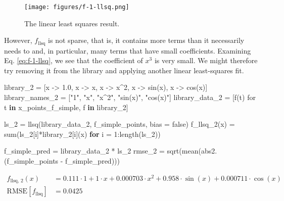 \documentclass[
]{article}
\newenvironment{Shaded}{\begin{snugshade}}{\end{snugshade}}
\newcommand{\ConstantTok}[1]{\textcolor[rgb]{0.56,0.35,0.01}{#1}}
\newcommand{\ControlFlowTok}[1]{\textcolor[rgb]{0.00,0.23,0.31}{\textbf{#1}}}
\newcommand{\FloatTok}[1]{\textcolor[rgb]{0.68,0.00,0.00}{#1}}
\newcommand{\FunctionTok}[1]{\textcolor[rgb]{0.28,0.35,0.67}{#1}}
\newcommand{\KeywordTok}[1]{\textcolor[rgb]{0.00,0.23,0.31}{\textbf{#1}}}
\newcommand{\NormalTok}[1]{\textcolor[rgb]{0.00,0.23,0.31}{#1}}
\newcommand{\OperatorTok}[1]{\textcolor[rgb]{0.37,0.37,0.37}{#1}}
\newcommand{\StringTok}[1]{\textcolor[rgb]{0.13,0.47,0.30}{#1}}
\begin{document}
\begin{figure}
    \centering
    \texttt{[image: figures/f-1-llsq.png]}
    \caption{The linear least squares result.}
    \label{fig:f-1-llsq}
\end{figure}

However, \(f_{\text{llsq}}\) is not sparse, that is, it contains more
terms than it necessarily needs to and, in particular, many terms that
have small coefficients. Examining Eq. \eqref{eq:f-1-llsq}, we see that
the coefficient of \(x^3\) is very small. We might therefore try
removing it from the library and applying another linear least-squares
fit.

\begin{Shaded}
\begin{Highlighting}[]
\NormalTok{library\_2 }\OperatorTok{=}\NormalTok{ [x }\OperatorTok{{-}\textgreater{}} \FloatTok{1.0}\NormalTok{, x }\OperatorTok{{-}\textgreater{}}\NormalTok{ x, x }\OperatorTok{{-}\textgreater{}}\NormalTok{ x}\OperatorTok{\^{}}\FloatTok{2}\NormalTok{, x }\OperatorTok{{-}\textgreater{}} \FunctionTok{sin}\NormalTok{(x), x }\OperatorTok{{-}\textgreater{}} \FunctionTok{cos}\NormalTok{(x)]}
\NormalTok{library\_names\_2 }\OperatorTok{=}\NormalTok{ [}\StringTok{"1"}\NormalTok{, }\StringTok{"x"}\NormalTok{, }\StringTok{"x\^{}2"}\NormalTok{, }\StringTok{"sin(x)"}\NormalTok{, }\StringTok{"cos(x)"}\NormalTok{]}
\NormalTok{library\_data\_2 }\OperatorTok{=}\NormalTok{ [}\FunctionTok{f}\NormalTok{(t) for t }\KeywordTok{in}\NormalTok{ x\_points\_f\_simple, f }\KeywordTok{in}\NormalTok{ library\_2]}

\NormalTok{ls\_2 }\OperatorTok{=} \FunctionTok{llsq}\NormalTok{(library\_data\_2, f\_simple\_points, bias }\OperatorTok{=} \ConstantTok{false}\NormalTok{)}
\FunctionTok{f\_llsq\_2}\NormalTok{(x) }\OperatorTok{=} \FunctionTok{sum}\NormalTok{(ls\_2[i]}\OperatorTok{*}\NormalTok{library\_2[i](x) }\ControlFlowTok{for}\NormalTok{ i }\OperatorTok{=} \FloatTok{1}\OperatorTok{:}\FunctionTok{length}\NormalTok{(ls\_2))}

\NormalTok{f\_simple\_pred }\OperatorTok{=}\NormalTok{ library\_data\_2 }\OperatorTok{*}\NormalTok{ ls\_2}
\NormalTok{rmse\_2 }\OperatorTok{=} \FunctionTok{sqrt}\NormalTok{(}\FunctionTok{mean}\NormalTok{(}\FunctionTok{abs2}\NormalTok{.(f\_simple\_points }\OperatorTok{{-}}\NormalTok{ f\_simple\_pred)))}
\end{Highlighting}
\end{Shaded}

\begin{subequations} \label{eq:f-2-llsq} \begin{align}    f_{\text{llsq, 2}}(x) &= 0.111 \cdot 1 + 1 \cdot x + 0.000703 \cdot x^{2} + 0.958 \cdot \sin\left( x \right) + 0.000711 \cdot \cos\left( x \right) \\
    \text{RMSE}[f_{\text{llsq}}] &= 0.0425 \end{align} \end{subequations}
\end{document}
